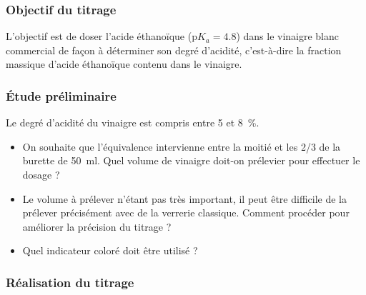 \documentclass{tp}
\newcommand{\pKa}{\ensuremath{\mathrm{p}K_a}}
\begin{document}
\subsubsection{Objectif du titrage}%
\label{ssub:objectif_du_titrage}

L'objectif est de doser l'acide éthanoïque ($\pKa=\num{4.8}$) dans le vinaigre blanc commercial de façon à déterminer son degré d'acidité, c'est-à-dire la fraction massique d'acide éthanoïque contenu dans le vinaigre. 

\subsubsection{Étude préliminaire}%
\label{ssub:etude_preliminaire}

Le degré d'acidité du vinaigre est compris entre \num{5} et \SI{8}{\percent}. 
\begin{itemize}
  \item On souhaite que l'équivalence intervienne entre la moitié et les 2/3 de la burette de \SI{50}{\milli\litre}. Quel volume de vinaigre doit-on prélevier pour effectuer le dosage ?

  \item Le volume à prélever n'étant pas très important, il peut être difficile de la prélever précisément avec de la verrerie classique. Comment procéder pour améliorer la précision du titrage ?

  \item Quel indicateur coloré doit être utilisé ?
\end{itemize}

\subsubsection{Réalisation du titrage}%
\label{ssub:realisation_du_titrage}
\end{document}
